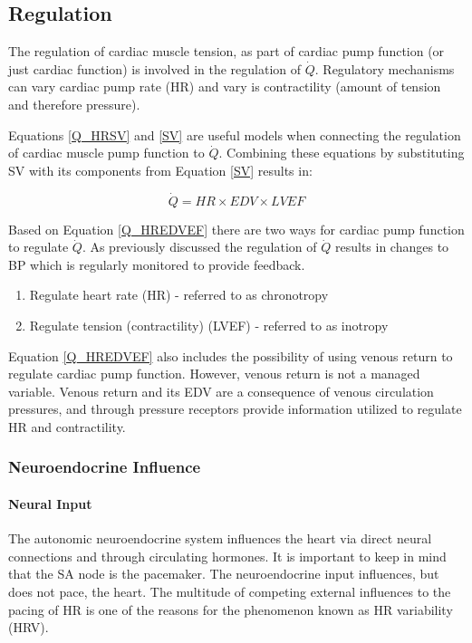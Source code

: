 \subsection{Regulation}

The regulation of cardiac muscle tension, as part of cardiac pump function (or just cardiac function) is involved in the regulation of $\dot{Q}$. Regulatory mechanisms can vary cardiac pump rate (HR) and vary is contractility (amount of tension and therefore pressure). 

Equations \ref{Q_HRSV} and \ref{SV} are useful models when connecting the regulation of cardiac muscle pump function to $\dot{Q}$. Combining these equations by substituting SV with its components from Equation \ref{SV} results in:

\begin{equation}
    \dot{Q} = HR \times EDV \times LVEF
    \label{Q_HREDVEF}
\end{equation}

Based on Equation \ref{Q_HREDVEF} there are two ways for cardiac pump function to regulate $\dot{Q}$. As previously discussed the regulation of $\dot{Q}$ results in changes to BP which is regularly monitored to provide feedback.

\begin{enumerate}
    \item Regulate heart rate (HR) - referred to as chronotropy
    \item Regulate tension (contractility) (LVEF) - referred to as inotropy
\end{enumerate}

Equation \ref{Q_HREDVEF} also includes the possibility of using venous return to regulate cardiac pump function. However, venous return is not a managed variable. Venous return and its EDV are a consequence of venous circulation pressures, and through pressure receptors provide information utilized to regulate HR and contractility.

\subsubsection{Neuroendocrine Influence}

\paragraph{Neural Input}

The autonomic neuroendocrine system influences the heart via direct neural connections and through circulating hormones. It is important to keep in mind that the SA node is the pacemaker. The neuroendocrine input influences, but does not pace, the heart. The multitude of competing external influences to the pacing of HR is one of the reasons for the phenomenon known as HR variability (HRV). 

